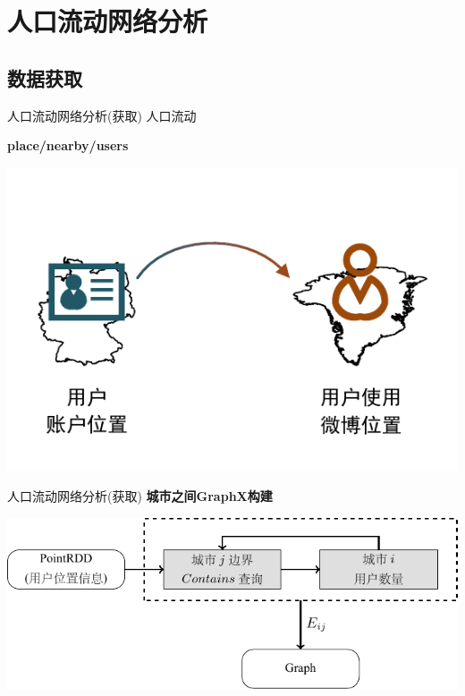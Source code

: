 \section{人口流动网络分析}

\subsection{数据获取}

\begin{frame}[c]{人口流动网络分析(获取)}
    \alert{人口流动}

    \textbf{place/nearby/users}

    \vspace{1em}
    \includegraphics[scale=0.8]{figures/floating.pdf}

\end{frame}

\begin{frame}[t]{人口流动网络分析(获取)}
    \textbf{城市之间GraphX构建}

    \vspace{1em}
    \includegraphics[scale=0.8]{figures/graph.pdf}
\end{frame}

